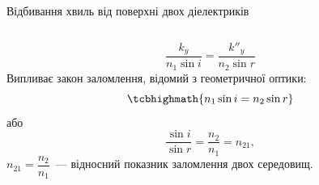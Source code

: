\documentclass[onlytextwidth]{beamer}
\begin{document}
\begin{frame}[t]{Відбивання хвиль від поверхні двох діелектриків}
\begin{columns}
\begin{column}{0.5\linewidth}
{\begin{block}{}
\[					\]
					\[
						\frac{k_y}{n_1\sin{i}} = \frac{k''_y}{n_2\sin{r}}
					\]
					Випливає закон заломлення, відомий з геометричної оптики:
					\begin{equation*}
						\tcbhighmath{n_1\sin{i} = n_2\sin{r}}
					\end{equation*}
					або
					\begin{equation*}
						\frac{\sin i}{\sin r} = \frac{n_2}{n_1} = n_{21},
					\end{equation*}
					$n_{21} = \dfrac{n_2}{n_1}$~--- відносний показник заломлення двох середовищ.
				\end{block}
			}
		\end{column}
	\end{columns}
\end{frame}
\end{document}
